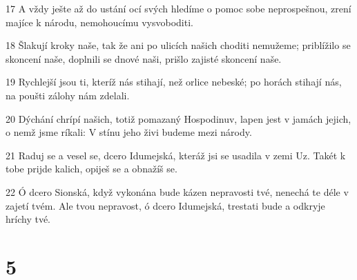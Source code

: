 \par 17 A vždy ješte až do ustání ocí svých hledíme o pomoc sobe neprospešnou, zrení majíce k národu, nemohoucímu vysvoboditi.
\par 18 Šlakují kroky naše, tak že ani po ulicích našich choditi nemužeme; priblížilo se skoncení naše, doplnili se dnové naši, prišlo zajisté skoncení naše.
\par 19 Rychlejší jsou ti, kteríž nás stihají, než orlice nebeské; po horách stihají nás, na poušti zálohy nám zdelali.
\par 20 Dýchání chrípí našich, totiž pomazaný Hospodinuv, lapen jest v jamách jejich, o nemž jsme ríkali: V stínu jeho živi budeme mezi národy.
\par 21 Raduj se a vesel se, dcero Idumejská, kteráž jsi se usadila v zemi Uz. Takét k tobe prijde kalich, opiješ se a obnažíš se.
\par 22 Ó dcero Sionská, když vykonána bude kázen nepravosti tvé, nenechá te déle v zajetí tvém. Ale tvou nepravost, ó dcero Idumejská, trestati bude a odkryje hríchy tvé.

\chapter{5}

